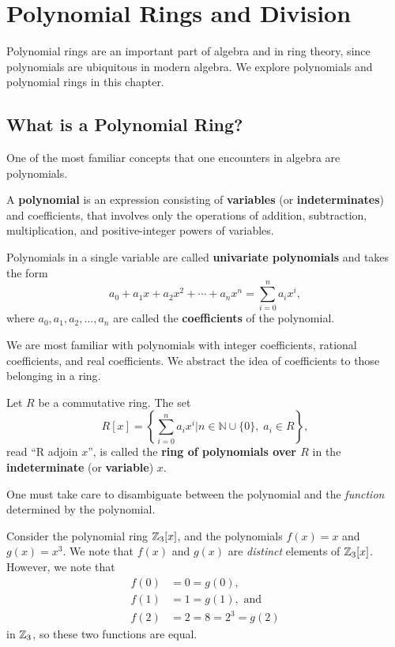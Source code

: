 \chapter{Polynomial Rings and Division}
Polynomial rings are an important part of algebra and in ring theory, since polynomials are ubiquitous in modern algebra. We explore polynomials and polynomial rings in this chapter.

\section{What is a Polynomial Ring?}
One of the most familiar concepts that one encounters in algebra are polynomials.

\begin{definition}
    A \textbf{polynomial} is an expression consisting of \textbf{variables} (or \textbf{indeterminates}) and coefficients, that involves only the operations of addition, subtraction, multiplication, and positive-integer powers of variables.
\end{definition}
\begin{definition}
    Polynomials in a single variable are called \textbf{univariate polynomials} and takes the form
    \[
        a_0+a_1x+a_2x^2+\cdots+a_nx^n = \sum_{i=0}^n a_ix^i,
    \]
    where $a_0, a_1, a_2, \dots, a_n$ are called the \textbf{coefficients} of the polynomial.
\end{definition}

We are most familiar with polynomials with integer coefficients, rational coefficients, and real coefficients. We abstract the idea of coefficients to those belonging in a ring.

\begin{definition}
    Let $R$ be a commutative ring. The set
    \[
        R[x] = \left\{\sum_{i=0}^n a_ix^i \vert n \in \mathbb{N} \cup \{0\}, \; a_i \in R\right\},
    \]
    read ``R adjoin $x$'', is called the \textbf{ring of polynomials over $R$} in the \textbf{indeterminate} (or \textbf{variable}) $x$.
\end{definition}

One must take care to disambiguate between the polynomial and the \textit{function} determined by the polynomial.
\begin{example}
    Consider the polynomial ring $\mathbb{Z}_3[x]$, and the polynomials $f(x) = x$ and $g(x) = x^3$. We note that $f(x)$ and $g(x)$ are \textit{distinct} elements of $\mathbb{Z}_3[x]$. However, we note that
    \begin{align*}
        f(0) &= 0 = g(0),\\
        f(1) &= 1 = g(1), \text{ and }\\
        f(2) &= 2 = 8 = 2^3 = g(2)
    \end{align*}
    in $\mathbb{Z}_3$, so these two functions are equal.
\end{example}


